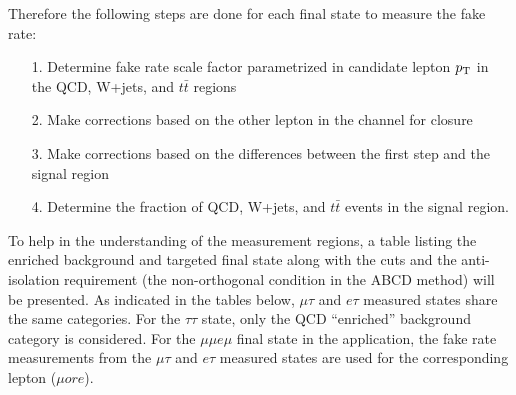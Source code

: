 




Therefore the following steps are done for each final state to measure the fake rate:
\begin{enumerate}
\item[1.] Determine fake rate scale factor parametrized in candidate lepton $p_{\mathrm{T}}$ in the QCD, W+jets, and $t\bar{t}$ regions
\item[2.] Make corrections based on the other lepton in the channel for closure 
\item[3.] Make corrections based on the differences between the first step and the signal region
\item[4.] Determine the fraction of QCD, W+jets, and $t\bar{t}$ events in the signal region.
\end{enumerate} 

To help in the understanding of the measurement regions, a table listing the enriched background and targeted final state along with the cuts and the anti-isolation requirement (the non-orthogonal condition in the ABCD method) will be presented. 
As indicated in the tables below, $\mu\tau$ and $ e \tau$ measured states share the same categories. For the $\tau\tau$ state, only the QCD ``enriched'' background category is considered. 
For the $\mu\mu e\mu$ final state in the application, the fake rate measurements from the $\mu\tau$ and $e \tau$ measured states are used for the corresponding lepton ($\mu or e$). 


